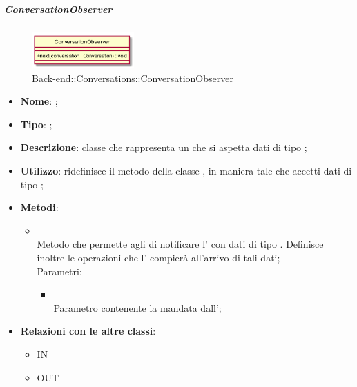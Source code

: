 \hypertarget{ConversationObserver_label}{\subparagraph{ConversationObserver}}
\begin{figure}[h]
	\centering
	\includegraphics[width=0.35\textwidth,height=\textheight,keepaspectratio]{images/ClassConversationObserver.png}
	\caption{Back-end::Conversations::ConversationObserver}
\end{figure}
\begin{itemize}
	\item \textbf{Nome}: ;
	\item \textbf{Tipo}: ;
	\item \textbf{Descrizione}: classe che rappresenta un  che si aspetta dati di tipo ;
	\item \textbf{Utilizzo}: ridefinisce il metodo  della classe , in maniera tale che accetti dati di tipo ;
	\item \textbf{Metodi}:
	\begin{itemize}
		\item[]  \\		Metodo che permette agli  di notificare l' con dati di tipo . Definisce inoltre le operazioni che l' compierà all'arrivo di tali dati;\\
		Parametri:
		\begin{itemize}
			\item {} \\
			Parametro contenente la  mandata dall';
		\end{itemize}
	\end{itemize}
	\item \textbf{Relazioni con le altre classi}:
	\begin{itemize}
		\item IN \hyperlink{ConversationObservable_label}{}
		\item OUT \hyperlink{Conversation_label}{}
	\end{itemize}
\end{itemize}
\FloatBarrier

